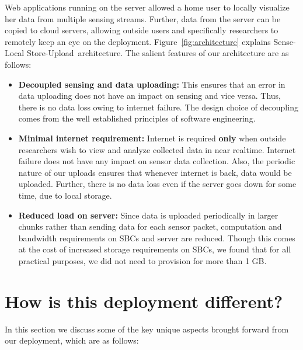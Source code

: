 \documentclass[10pt]{sensys-proc}
\newcommand{\figref}[1]{Figure~\ref{#1}}
\newcommand{\paradigms}{Sense-Local Store-Upload~}
\begin{document}
Web applications running on the server allowed a home user to locally visualize her data from multiple sensing streams. Further, data from the server can be copied to cloud servers, allowing outside users and specifically researchers to remotely keep an eye on the deployment. \figref{fig:architecture} explains \paradigms architecture. The salient features of our architecture are as follows:
\begin{itemize}
\item \textbf{Decoupled sensing and data uploading:} This ensures that an error in data uploading does not have an impact on sensing and vice versa. Thus, there is no data loss owing to internet failure. The design choice of decoupling comes from the well established principles of software engineering.
\item \textbf{Minimal internet requirement:} Internet is required \textbf{only} when outside researchers wish to view and analyze collected data in near realtime. Internet failure does not have any impact on sensor data collection. Also, the periodic nature of our uploads ensures that whenever internet is back, data would be uploaded. Further, there is no data loss even if the server goes down for some time, due to local storage.
\item \textbf{Reduced load on server:} Since data is uploaded periodically in larger chunks rather than sending data for each sensor packet, computation and bandwidth requirements on SBCs and server are reduced. Though this comes at the cost of increased storage requirements on SBCs, we found that for all practical purposes, we did not need to provision for more than 1 GB.
\end{itemize}



\section{How is this deployment different?}
\label{sec:learning}
In this section we discuss some of the key unique aspects brought forward from our deployment, which are as follows:
\end{document}
